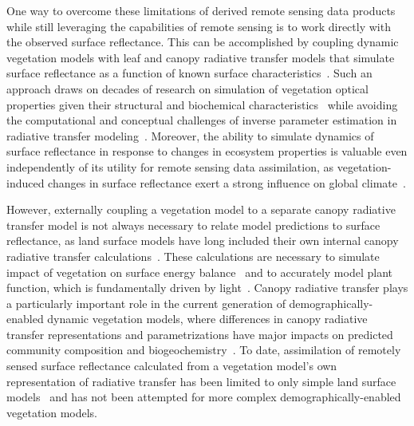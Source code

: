 One way to overcome these limitations of derived remote sensing data products while still leveraging the capabilities of remote sensing is to work directly with the observed surface reflectance.
This can be accomplished by coupling dynamic vegetation models with leaf and canopy radiative transfer models that simulate surface reflectance as a function of known surface characteristics~\citep{knorr2001assimilation, nouvellon2001coupling, quaife2008assimilating}.
Such an approach draws on decades of research on simulation of vegetation optical properties given their structural and biochemical characteristics~\citep{dickinson_1983_land, sellers1985canopy, verhoef1984light, lewis2007spectral, jacquemoud2009prospect, pinty2004synergy, widlowski2007third, widlowski2015fourth, hogan_2018_fast} while avoiding the computational and conceptual challenges of inverse parameter estimation in radiative transfer modeling~\citep{combal2003retrieval, lewis2007spectral}.
Moreover, the ability to simulate dynamics of surface reflectance in response to changes in ecosystem properties is valuable even independently of its utility for remote sensing data assimilation, as vegetation-induced changes in surface reflectance exert a strong influence on global climate~\citep{bonan2008forests, swann2010changes, swann2012midlatitude}.

However, externally coupling a vegetation model to a separate canopy radiative transfer model is not always necessary to relate model predictions to surface reflectance,
as land surface models have long included their own internal canopy radiative transfer calculations~\citep{dickinson1983land, sellers1985canopy}.
These calculations are necessary to simulate impact of vegetation on surface energy balance~\citep{bonan2008forests} and to accurately model plant function, which is fundamentally driven by light~\citep{hikosaka1995model, robakowski_2004_growth, niinemets2016withincanopy, keenan2016global}.
Canopy radiative transfer plays a particularly important role in the current generation of demographically-enabled dynamic vegetation models, where differences in canopy radiative transfer representations and parametrizations have major impacts on predicted community composition and biogeochemistry~\citep{loew_2014_do, fisher2017vegetation, viskari_2019_influence}.
To date, assimilation of remotely sensed surface reflectance calculated from a vegetation model's own representation of radiative transfer has been limited to only simple land surface models~\citep[e.g. SiPNET][]{zobitz_2014_joint} and has not been attempted for more complex demographically-enabled vegetation models.

